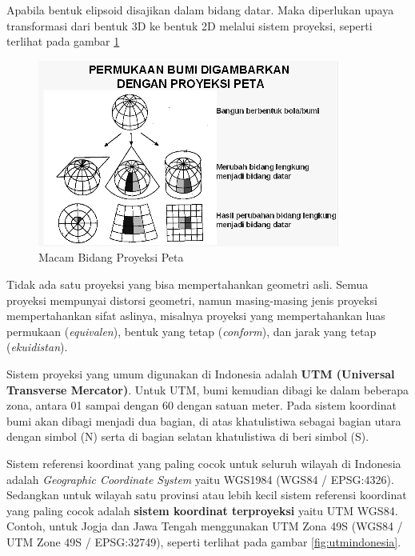 \begin{itemize}
    Apabila bentuk elipsoid disajikan dalam bidang datar. Maka diperlukan upaya transformasi dari bentuk 3D ke bentuk 2D melalui sistem proyeksi, seperti terlihat pada gambar \ref{fig:macamproyeksipeta}
    
    \begin{figure}[H]
      \centering
      \includegraphics[scale=1]{./resources/016-macam-bidang-proyeksi-peta}
      \caption{Macam Bidang Proyeksi Peta}
      \label{fig:macamproyeksipeta}
    \end{figure}
    
    Tidak ada satu proyeksi yang bisa mempertahankan geometri asli. Semua proyeksi mempunyai distorsi geometri, namun masing-masing jenis proyeksi mempertahankan sifat aslinya, misalnya proyeksi yang mempertahankan luas permukaan (\textit{equivalen}), bentuk yang tetap (\textit{conform}), dan jarak yang tetap (\textit{ekuidistan}).
    
    Sistem proyeksi yang umum digunakan di Indonesia adalah \textbf{UTM (Universal Transverse Mercator)}. Untuk UTM, bumi kemudian dibagi ke dalam beberapa zona, antara 01 sampai dengan 60 dengan satuan meter. Pada sistem koordinat bumi akan dibagi menjadi dua bagian, di atas khatulistiwa sebagai bagian utara dengan simbol (N) serta di bagian selatan khatulistiwa di beri simbol (S).
    
    Sistem referensi koordinat yang paling cocok untuk seluruh wilayah di Indonesia adalah \textit{Geographic Coordinate System} yaitu WGS1984 (WGS84 / EPSG:4326). Sedangkan untuk wilayah satu provinsi atau lebih kecil sistem referensi koordinat yang paling cocok adalah \textbf{sistem koordinat terproyeksi} yaitu UTM WGS84. Contoh, untuk Jogja dan Jawa Tengah menggunakan UTM Zona 49S (WGS84 / UTM Zone 49S / EPSG:32749), seperti terlihat pada gambar \ref{fig:utmindonesia}.
    

\end{itemize}
